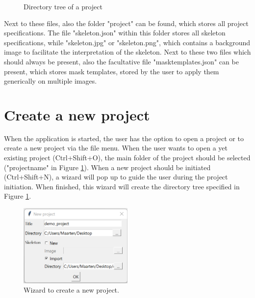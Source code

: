 \documentclass[a4paper, 11pt]{article}
\begin{document}
\begin{figure}[htb]
	\centering
	\begin{minipage}{5cm}	
	\end{minipage}
	\caption{Directory tree of a project}
	\label{fig:project_dir_tree}
\end{figure}

Next to these files, also the folder "project" can be found, which stores all project specifications. The file "skeleton.json" within this folder stores all skeleton specifications, while  "skeleton.jpg" or "skeleton.png", which contains a background image to facilitate the interpretation of the skeleton. Next to these two files which should always be present, also the facultative file "mask\textunderscore templates.json" can be present, which stores mask templates, stored by the user to apply them generically on multiple images.

\section{Create a new project}
When the application is started, the user has the option to open a project or to create a new project via the file menu. When the user wants to open a yet existing project (Ctrl+Shift+O), the main folder of the project should be selected ("project\textunderscore name" in Figure \ref{fig:project_dir_tree}). When a new project should be initiated (Ctrl+Shift+N), a wizard will pop up to guide the user during the project initiation. When finished, this wizard will create the directory tree specified in Figure \ref{fig:project_dir_tree}.

\begin{figure}[htb]
	\centering
	\includegraphics[width=0.5\textwidth]{new_project_wizard}
	\captionsetup{width=0.5\textwidth}
	\caption{Wizard to create a new project.}
	\label{fig:new_project_wizard}	
\end{figure}
\end{document}

